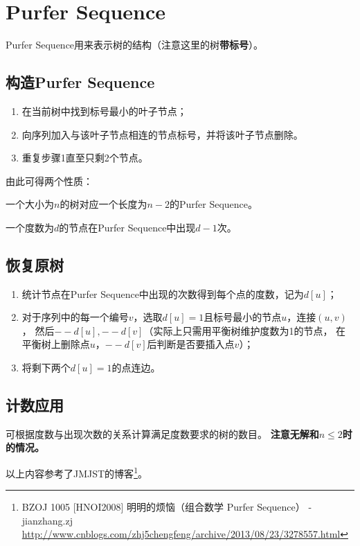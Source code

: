 \section{Purfer Sequence}
Purfer Sequence用来表示树的结构（注意这里的树{\bfseries 带标号}）。
\subsection{构造Purfer Sequence}
\begin{enumerate}
	\item 在当前树中找到标号最小的叶子节点；
	\item 向序列加入与该叶子节点相连的节点标号，并将该叶子节点删除。
	\item 重复步骤1直至只剩2个节点。
\end{enumerate}
由此可得两个性质：
\begin{property}[唯一性]
	一个大小为$n$的树对应一个长度为$n-2$的Purfer Sequence。
\end{property}
\begin{property}
	一个度数为$d$的节点在Purfer Sequence中出现$d-1$次。
\end{property}
\subsection{恢复原树}
\begin{enumerate}
	\item 统计节点在Purfer Sequence中出现的次数得到每个点的度数，记为$d[u]$；
	\item 对于序列中的每一个编号$v$，选取$d[u]=1$且标号最小的节点$u$，连接$(u,v)$，
		  然后$--d[u],--d[v]$（实际上只需用平衡树维护度数为1的节点，
		  在平衡树上删除点$u$，$--d[v]$后判断是否要插入点$v$）；
	\item 将剩下两个$d[u]=1$的点连边。
\end{enumerate}
\subsection{计数应用}
可根据度数与出现次数的关系计算满足度数要求的树的数目。
{\bfseries 注意无解和$n\leq 2$时的情况。}

以上内容参考了JMJST的博客\footnote{
	BZOJ 1005 [HNOI2008] 明明的烦恼（组合数学 Purfer Sequence） - jianzhang.zj
	\url{http://www.cnblogs.com/zhj5chengfeng/archive/2013/08/23/3278557.html}
}。
